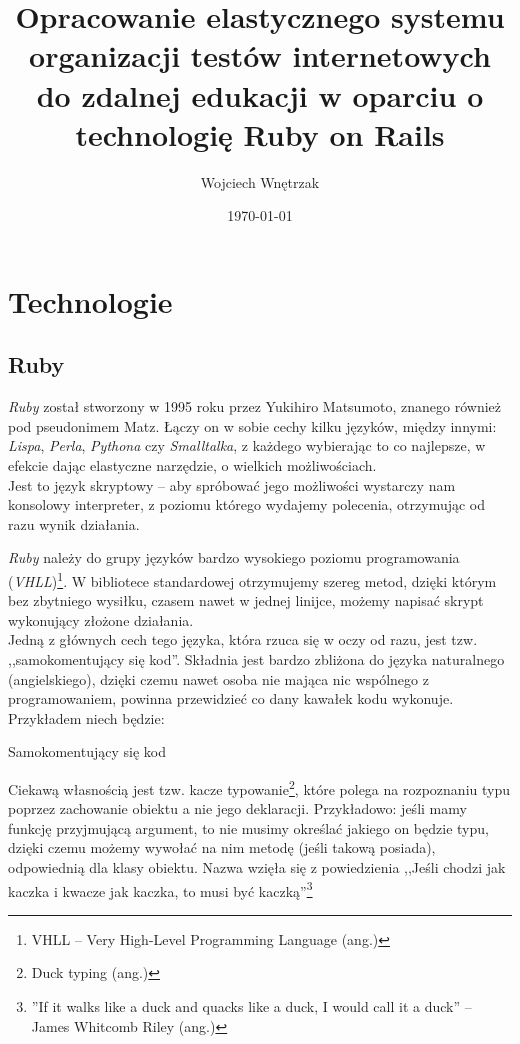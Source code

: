\documentclass[a4paper,12pt]{article}
\begin{document}
\author{Wojciech Wnętrzak}
\title{Opracowanie elastycznego systemu organizacji testów internetowych do zdalnej
edukacji w oparciu o technologię Ruby on Rails}
\date{\today}

\begin{titlepage}
\maketitle
\end{titlepage}

\section{Technologie}
\subsection{Ruby}
\emph{Ruby} został stworzony w 1995 roku przez Yukihiro Matsumoto, znanego również
pod pseudonimem Matz. Łączy on w sobie cechy kilku języków, między innymi: \emph{Lispa},
\emph{Perla}, \emph{Pythona} czy \emph{Smalltalka}, z każdego wybierając to co najlepsze,
w efekcie dając elastyczne narzędzie, o wielkich możliwościach.\\
Jest to język skryptowy -- aby spróbować jego możliwości wystarczy nam konsolowy
interpreter, z poziomu którego wydajemy polecenia, otrzymując od razu wynik działania.


\emph{Ruby} należy do grupy języków bardzo wysokiego poziomu programowania
(\emph{VHLL})\footnote{VHLL -- Very High-Level Programming Language (ang.)}.
W bibliotece standardowej otrzymujemy szereg metod, dzięki którym bez zbytniego wysiłku,
czasem nawet w jednej linijce, możemy napisać skrypt wykonujący złożone działania.\\
Jedną z głównych cech tego języka, która rzuca się w oczy od razu, jest tzw.
,,samokomentujący się kod''. Składnia jest bardzo zbliżona do języka naturalnego
(angielskiego), dzięki czemu nawet osoba nie mająca nic wspólnego z programowaniem,
powinna przewidzieć co dany kawałek kodu wykonuje. Przykładem niech będzie:
\begin{listing}
  
  \caption{Samokomentujący się kod}
  \label{listing:selfcommenting}
\end{listing}


Ciekawą własnością jest tzw. kacze typowanie\footnote{Duck typing (ang.)}, które polega na
rozpoznaniu typu poprzez zachowanie obiektu a nie jego deklaracji. Przykładowo: jeśli mamy
funkcję przyjmującą argument, to nie musimy określać jakiego on będzie typu, dzięki czemu
możemy wywołać na nim metodę (jeśli takową posiada), odpowiednią dla klasy obiektu. Nazwa
wzięła się z powiedzienia ,,Jeśli chodzi jak kaczka i kwacze jak kaczka, to musi być
kaczką''\footnote{''If it walks like a duck and quacks like a duck, I would call it a duck''
-- James Whitcomb Riley (ang.)}
\end{document}
